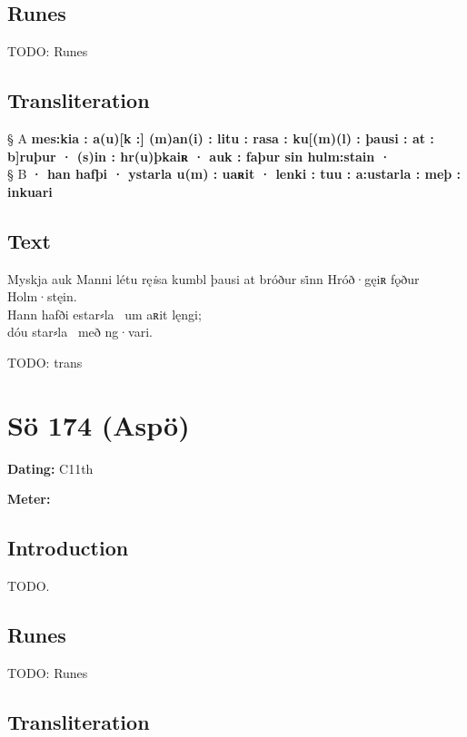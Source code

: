 \subsection{Runes}

TODO: Runes%

\subsection{Transliteration}

§ A \textbf{mes:kia : a(u)[k :] (m)an(i) : litu : rasa : ku[(m)(l) : þausi : at : b]ruþur · (s)in : hr(u)þkaiʀ · auk : faþur sin hulm:stain ·} \\
§ B \textbf{· han hafþi · ystarla u(m) : uaʀit · lenki : tuu : a:ustarla : meþ : inkuari}

\subsection{Text}

\bpg\bpa[0]%
Myskja auk Manni létu rę\emph{i}sa kumbl þausi at bróður si̇nn Hróð·gęiʀ fǫður Holm·stęin. \\
Hann hafði estar⸗la \hld\ um aʀit lęngi; \\
dóu star⸗la \hld\ með ng·vari.\epa

\bpb TODO: trans\epb\epg

\sectionline\clearpage


\section{Sö 174 (Aspö)}

\begin{flushright}%
\textbf{Dating:} C11th

\textbf{Meter:} \Fornyrdislag
\end{flushright}%

\subsection{Introduction}

TODO.

\subsection{Runes}

TODO: Runes%

\subsection{Transliteration}

